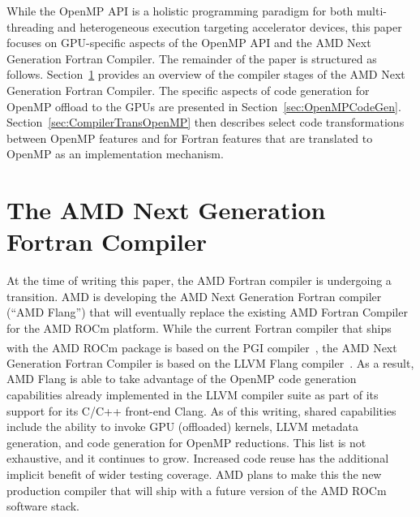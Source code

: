 \documentclass[acmtog,natbib=false]{acmart}
\newcommand{\registered}[0]{\textsuperscript{\textregistered}\xspace}
\newcommand{\trademark}[0]{\texttrademark\xspace}
\begin{document}
While the OpenMP \ac{API} is a holistic programming paradigm for both multi-threading and heterogeneous execution targeting accelerator devices, this paper focuses on \acs{GPU}-specific aspects of the OpenMP \ac{API} and the AMD Next Generation Fortran Compiler.
The remainder of the paper is structured as follows.
Section~\ref{sec:LLVMFlangCompiler} provides an overview of the compiler stages of the AMD Next Generation Fortran Compiler.
The specific aspects of code generation for OpenMP offload to the \acp{GPU} are presented in Section~\ref{sec:OpenMPCodeGen}.
Section~\ref{sec:CompilerTransOpenMP} then describes select code transformations between OpenMP features and for Fortran features that are translated to OpenMP as an implementation mechanism.


\section{The AMD Next Generation Fortran Compiler}
\label{sec:LLVMFlangCompiler}

At the time of writing this paper, the AMD Fortran compiler is undergoing a transition.
AMD is developing the AMD Next Generation Fortran compiler (``AMD Flang'') that will eventually replace the existing AMD Fortran Compiler for the AMD ROCm\trademark platform.
While the current Fortran compiler that ships with the AMD ROCm\trademark package is based on the PGI\registered compiler~\cite{Lara17,Pric17}, the AMD Next Generation Fortran Compiler is based on the LLVM Flang compiler~\cite{LLVM25}.
As a result, AMD Flang is able to take advantage of the OpenMP code generation capabilities already implemented in the LLVM compiler suite as part of its support for its C/C++ front-end Clang.
As of this writing, shared capabilities include the ability to invoke GPU (offloaded) kernels, LLVM metadata generation, and code generation for OpenMP reductions.
This list is not exhaustive, and it continues to grow.
Increased code reuse has the additional implicit benefit of wider testing coverage.
AMD plans to make this the new production compiler that will ship with a future version of the AMD ROCm\trademark software stack.
\end{document}
